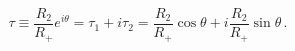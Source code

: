\begin{equation}
\tau\equiv  \frac{R_2}{R_+}e^{i\theta}
    =\tau_1+i\tau_2=\frac{R_2}{R_+}\cos\theta +i\frac{R_2}{R_+}\sin\theta\,.
\end{equation}

